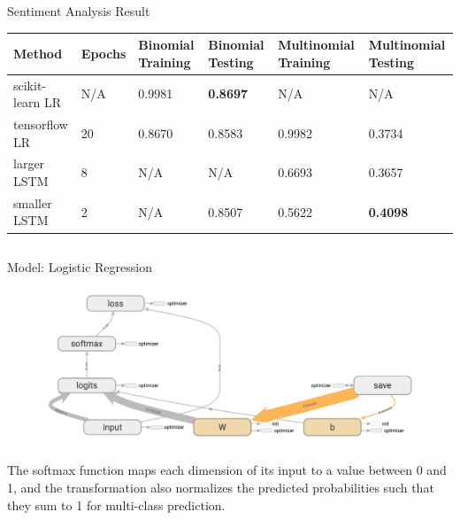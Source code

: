 \documentclass[final]{beamer}
\newlength{\onecolwid}
\newlength{\twocolwid}
\begin{document}
\begin{frame}[t]
\begin{columns}[t]
\begin{column}{\twocolwid}
\begin{alertblock}{Sentiment Analysis Result}
    \begin{table}
        \centering
        \label{my-label}
        \begin{tabularx}{\textwidth}{ X X X  X X  X }
        \toprule
        Method & Epochs & Binomial Training & Binomial Testing & Multinomial Training & Multinomial Testing \\
        \midrule
        scikit-learn LR & N/A & 0.9981 & \textbf{0.8697} & N/A & N/A \\
        tensorflow LR & 20 &  0.8670 & 0.8583 & 0.9982 & 0.3734 \\
        larger LSTM & 8 & N/A & N/A & 0.6693 & 0.3657 \\
        smaller LSTM  & 2 & N/A    & 0.8507 & 0.5622   & \textbf{0.4098} \\
        \bottomrule
        \end{tabularx}
    \end{table}
\end{alertblock} 


\begin{columns}[t,totalwidth=\twocolwid] %

\begin{column}{\onecolwid} %


\begin{block}{Model: Logistic Regression}
\begin{figure}
\includegraphics[width=0.8\linewidth]{figure/model_architecture}
\end{figure}
The softmax function maps each dimension of its input to a value between 0
and 1, and the transformation also normalizes the predicted probabilities such that
they sum to 1 for multi-class prediction. 

\end{block}


\end{column}
\end{columns}
\end{column}
\end{columns}
\end{frame}
\end{document}
